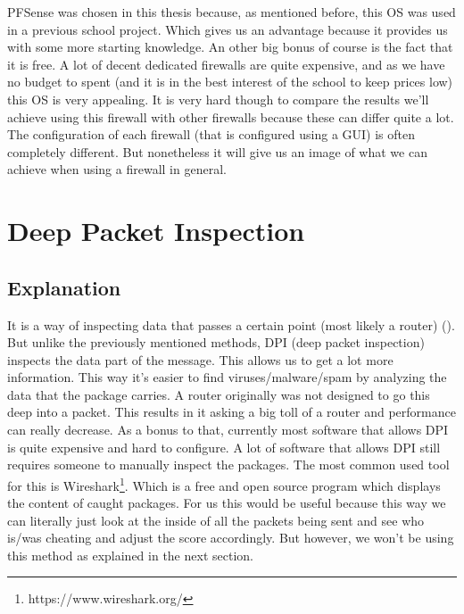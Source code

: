 PFSense was chosen in this thesis because, as mentioned before, this OS was used in a previous school project. Which gives us an advantage because it provides us with some more starting knowledge. An other big bonus of course is the fact that it is free. A lot of decent dedicated firewalls are quite expensive, and as we have no budget to spent (and it is in the best interest of the school to keep prices low) this OS is very appealing. It is very hard though to compare the results we'll achieve using this firewall with other firewalls because these can differ quite a lot. The configuration of each firewall (that is configured using a GUI) is often completely different. But nonetheless it will give us an image of what we can achieve when using a firewall in general.

\section{Deep Packet Inspection}
\subsection{Explanation}
It is a way of inspecting data that passes a certain point (most likely a router) (\textcite{SourceDpi}). But unlike the previously mentioned methods, DPI (deep packet inspection) inspects the data part of the message. This allows us to get a lot more information. This way it's easier to find viruses/malware/spam by analyzing the data that the package carries. A router originally was not designed to go this deep into a packet. This results in it asking a big toll of a router and performance can really decrease. As a bonus to that, currently most software that allows DPI is quite expensive and hard to configure. A lot of software that allows DPI still requires someone to manually inspect the packages. The most common used tool for this is Wireshark\footnote{https://www.wireshark.org/}. Which is a free and open source program which displays the content of caught packages.
For us this would be useful because this way we can literally just look at the inside of all the packets being sent and see who is/was cheating and adjust the score accordingly. But however, we won't be using this method as explained in the next section.
